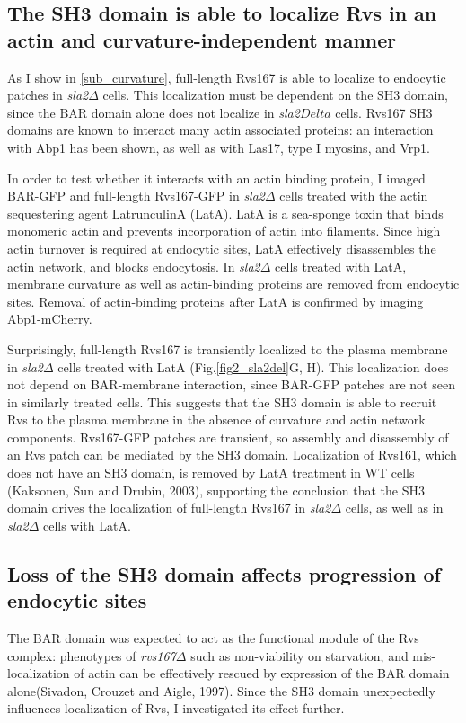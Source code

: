 	\subsection{The SH3 domain is able to localize Rvs in an actin and curvature-independent manner}
	\label{delsh3_latA}
As I show in \ref{sub_curvature}, full-length Rvs167 is able to localize to endocytic patches in \textit{sla2$\Delta$} cells. This localization must be dependent on the SH3 domain, since the BAR domain alone does not localize in \textit{sla2$Delta$} cells. Rvs167 SH3 domains are known to interact many actin associated proteins: an interaction with Abp1 has been shown, as well as with Las17, type I myosins, and Vrp1. 

	\vspace{5mm}
	
In order to test whether it interacts with an actin binding protein, I imaged BAR-GFP and full-length Rvs167-GFP in \textit{sla2$\Delta$} cells treated with the actin sequestering agent LatrunculinA (LatA). LatA is a sea-sponge toxin that binds monomeric actin and prevents incorporation of actin into filaments. Since high actin turnover is required at endocytic sites, LatA effectively disassembles the actin network, and blocks endocytosis. In \textit{sla2$\Delta$} cells treated with LatA, membrane curvature as well as actin-binding proteins are removed from endocytic sites. Removal of actin-binding proteins after LatA is confirmed by imaging Abp1-mCherry.

	\vspace{5mm}
Surprisingly, full-length Rvs167 is transiently localized to the plasma membrane in \textit{sla2$\Delta$} cells treated with LatA (Fig.\ref{fig2_sla2del}G, H). This localization does not depend on BAR-membrane interaction, since BAR-GFP patches are not seen in similarly treated cells. This suggests that the SH3 domain is able to recruit Rvs to the plasma membrane in the absence of curvature and actin network components. Rvs167-GFP patches are transient, so assembly and disassembly of an Rvs patch can be mediated by the SH3 domain. Localization of Rvs161, which does not have an SH3 domain, is removed by LatA treatment in WT cells (Kaksonen, Sun and Drubin, 2003), supporting the conclusion that the SH3 domain drives the localization of full-length Rvs167 in \textit{sla2$\Delta$}  cells, as well as in \textit{sla2$\Delta$}  cells with LatA. 


	\subsection{Loss of the SH3 domain affects progression of \\endocytic sites}
	\label{delsh3_movement}
The BAR domain was expected to act as the functional module of the Rvs complex: phenotypes of \textit{rvs167$\Delta$}  such as non-viability on starvation, and mis-localization of actin can be effectively rescued by expression of the BAR domain alone(Sivadon, Crouzet and Aigle, 1997). Since the SH3 domain unexpectedly influences localization of Rvs, I investigated its effect further.

